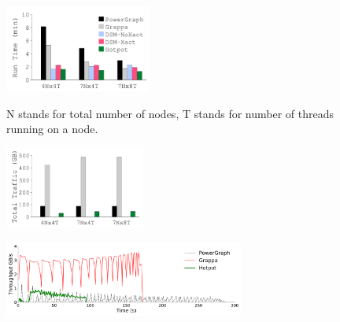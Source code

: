 {
\begin{figure}[th]
\begin{minipage}{1.9in}
\begin{center}
\centerline{\includegraphics[width=1.9in]{Figures/g_plot_graph_ATC_runtime.pdf}}
\vspace{-0.05in}
{
N stands for total number of nodes, T stands for number of threads running on a node.
}
\end{center}
\end{minipage}
\begin{minipage}{0.04in}
\hspace{0.04in}
\end{minipage}
\begin{minipage}{1.8in}
\begin{center}
\centerline{\includegraphics[width=1.8in]{Figures/g_plot_graph_ATC_network.pdf}}
\vspace{-0.05in}
{
}
\end{center}
\end{minipage}
\begin{minipage}{0.04in}
\hspace{0.04in}
\end{minipage}
\begin{minipage}{3.1in}
\begin{center}
\centerline{\includegraphics[width=3.1in]{Figures/g_plot_combined_trace_timewindow.pdf}}
\vspace{-0.05in}
{
}
\end{center}
\end{minipage}
\vspace{-0.3in}
\end{figure}
}
